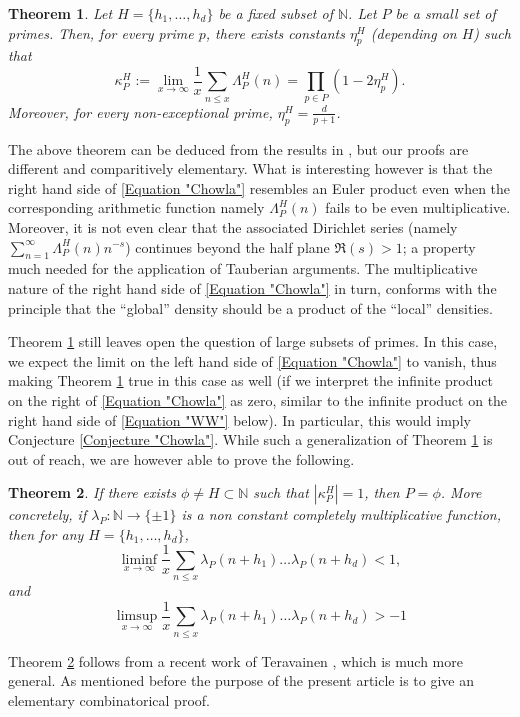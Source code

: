 \documentclass[12pt, a4paper]{amsart}
\newtheorem{theorem}{Theorem}
\theoremstyle{remark}
\theoremstyle{proof}
\numberwithin{equation}{section}
\numberwithin{assumption}{section}
\newcommand{\N}{\mathbb{N}}
\begin{document}
	\begin{theorem}\label{Theorem "Main Theorem"} 
		Let $H = \{h_1, \ldots, h_d\}$ be a fixed subset of $\N$. Let $P$ be a small set of primes. Then, for every prime $p$, there exists constants $\eta_p^H$ (depending on $H$) such that
		\begin{equation}\label{Equation "Chowla"}
			\kappa_P^H:=\lim_{x\to\infty}\frac{1}{x} \sum_{n\leqslant x} \Lambda_P^H(n) =   \prod_{p\in P} \left(1 - 2\eta_p^H\right).
		\end{equation}
		Moreover, for every non-exceptional prime, $\eta_p^H = \frac{d}{p+1}$. 
	\end{theorem}
	The above theorem can be deduced from the results in \cite{Klurman}, but our proofs are different and comparitively elementary. What is interesting however is that the right hand side of \eqref{Equation "Chowla"} resembles an Euler product even when the corresponding arithmetic function namely $\Lambda_P^H(n)$ fails to be even multiplicative. Moreover, it is not even clear that the associated Dirichlet series (namely $\sum_{n=1}^{\infty} \Lambda_P^H(n) n^{-s}$) continues beyond the half plane $\Re(s) > 1$; a property much needed for the application of Tauberian arguments. The multiplicative nature of the right hand side of \eqref{Equation "Chowla"} in turn, conforms with the principle that the ``global'' density should be a product of the ``local'' densities.
	
	Theorem \ref{Theorem "Main Theorem"} still leaves open the question of large subsets of primes. In this case, we expect the limit on the left hand side of \eqref{Equation "Chowla"} to vanish, thus making Theorem \ref{Theorem "Main Theorem"} true in this case as well (if we interpret the infinite product on the right of \eqref{Equation "Chowla"} as zero, similar to the infinite product on the right hand side of \eqref{Equation "WW"} below). In particular, this would imply Conjecture \ref{Conjecture "Chowla"}. While such a generalization of Theorem \ref{Theorem "Main Theorem"} is out of reach, we are however able to prove the following.
	\begin{theorem}\label{Theorem "Second Main Theorem"}
		If there exists $\phi\neq H\subset \N$ such that $|\kappa_P^H|=1$, then $P=\phi$. More concretely, if $\lambda_P: \N\to \{\pm 1\}$ is a non constant completely multiplicative function, then for any $H = \{h_1,\ldots, h_d\}$,
		\begin{equation}\label{Equation "Liminf"}
			\liminf_{x\to\infty} \frac{1}{x} \sum_{n\leqslant x} \lambda_P(n+h_1)\ldots \lambda_P(n+h_d) < 1,
		\end{equation}
		and
		\begin{equation}\label{Equation "Limsup"}
			\limsup_{x\to\infty} \frac{1}{x} \sum_{n\leqslant x} \lambda_P(n+h_1)\ldots \lambda_P(n+h_d) > -1
		\end{equation}
	\end{theorem}
	Theorem \ref{Theorem "Second Main Theorem"} follows from a recent work of Teravainen \cite{JoniAMJ}, which is much more general. As mentioned before the purpose of the present article is to give an elementary combinatorical proof. 
	
\end{document}
